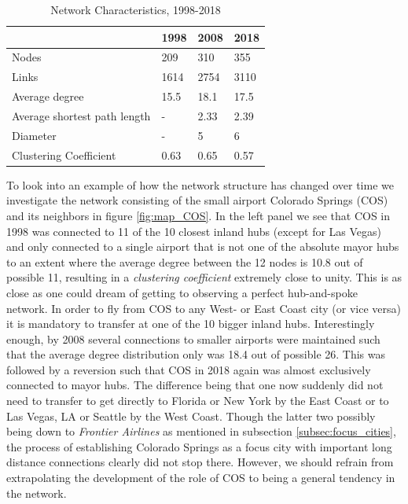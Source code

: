 \begin{table}[H]
\centering 
\caption{Network Characteristics, 1998-2018}
\label{tab: temporal}
\begin{tabular}{|l|l|l|l|}
\hline
\textbf{}                    & \textbf{1998} & \textbf{2008} & \textbf{2018} \\ \hline
Nodes                        & 209           & 310           & 355           \\
Links                        & 1614          & 2754          & 3110          \\
Average degree               & 15.5         & 18.1         & 17.5          \\
Average shortest path length & -           & 2.33          & 2.39          \\ 
Diameter                     & -             & 5             & 6           \\
Clustering Coefficient       & 0.63          & 0.65          & 0.57          \\ \hline
\end{tabular}
\end{table}
\noindent
To look into an example of how the network structure has changed over time we investigate the network consisting of the small airport Colorado Springs (COS) and its neighbors in figure \ref{fig:map_COS}. In the left panel we see that COS in 1998 was connected to 11 of the 10 closest inland hubs (except for Las Vegas) and only connected to a single airport that is not one of the absolute mayor hubs to an extent where the average degree between the 12 nodes is 10.8 out of possible 11, resulting in a \textit{clustering coefficient} extremely close to unity. This is as close as one could dream of getting to observing a perfect hub-and-spoke network. In order to fly from COS to any West- or East Coast city (or vice versa) it is mandatory to transfer at one of the 10 bigger inland hubs. Interestingly enough, by 2008 several connections to smaller airports were maintained such that the average degree distribution only was 18.4 out of possible 26. This was followed by a reversion such that COS in 2018 again was almost exclusively connected to mayor hubs. The difference being that one now suddenly did not need to transfer to get directly to Florida or New York by the East Coast or to Las Vegas, LA or Seattle by the West Coast. Though the latter two possibly being down to \textit{Frontier Airlines} as mentioned in subsection \ref{subsec:focus_cities}, the process of establishing Colorado Springs as a focus city with important long distance connections clearly did not stop there. However, we should refrain from extrapolating the development of the role of COS to being a general tendency in the network.
